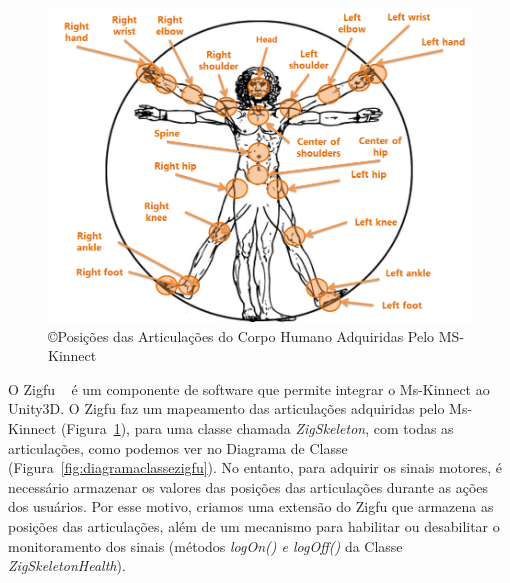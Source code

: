 \begin{figure}[!htbp]
 \centering
 \includegraphics[scale=0.4]{./img/articulacoes.png}
\caption[Posições das Articulações do Corpo Humano Adquiridas Pelo MS-Kinnect]{\copyright Posições das Articulações do Corpo Humano Adquiridas Pelo MS-Kinnect ~\cite{kinnect2013}}
 \label{fig:articulacoeskinnect}
\end{figure}

O Zigfu ~\cite{zigfu} é um componente de software que permite integrar o Ms-Kinnect ao Unity3D. O Zigfu faz um mapeamento das articulações adquiridas pelo Ms-Kinnect (Figura~\ref{fig:articulacoeskinnect}), para uma classe chamada \textit{ZigSkeleton}, com todas as articulações, como podemos ver no Diagrama de Classe (Figura~\ref{fig:diagramaclassezigfu}). No entanto, para adquirir os sinais motores, é necessário armazenar os valores das posições das articulações durante as ações dos usuários. Por esse motivo, criamos uma extensão do Zigfu que armazena as posições das articulações, além de um mecanismo para habilitar ou desabilitar o monitoramento dos sinais (métodos \textit{logOn() e logOff()} da Classe \textit{ZigSkeletonHealth}).

